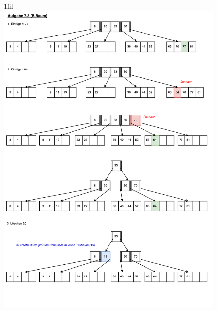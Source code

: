 \documentclass[11pt, a4paper]{article}
\makeatletter
\newcommand*{\centerfloat}{%
  \parindent \z@
  \leftskip \z@ \@plus 1fil \@minus \textwidth
  \rightskip\leftskip
  \parfillskip \z@skip}
\makeatother
\begin{document}
\begin{figure}[h]
\centerfloat
\includegraphics[page=2,scale=0.9]{DBIS7_3.pdf}
\end{figure}

\end{document}
